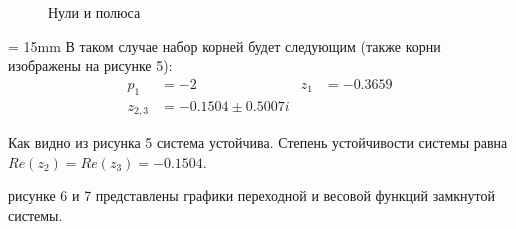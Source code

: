 \documentclass[a4paper, 12pt]{article}
\begin{document}
\noindent
\begin{minipage}[t]{0.5\textwidth}
    \begin{figure} [H]
        \centering
        \caption{Нули и полюса}
    \end{figure}
\end{minipage}
\begin{minipage}[t]{0.5\textwidth}
    \vspace{0.5cm}
    \parindent = 15mm
    В таком случае набор корней будет следующим (также корни изображены на рисунке 5):
    \begin{align*}
        p_1 & = -2 & 
        z_1 & =  -0.3659 \\
        z_{2, 3} & =  -0.1504 \pm 0.5007i &
    \end{align*} \par
    Как видно из рисунка 5 система устойчива. Степень устойчивости системы равна $Re(z_2) = Re(z_3) = -0.1504$.
\end{minipage}

\newpage
{} рисунке 6 и 7 представлены графики переходной и весовой функций замкнутой системы.
\end{document}
